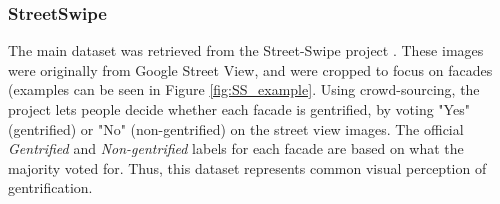 \subsubsection{StreetSwipe}
The main dataset was retrieved from the Street-Swipe project \cite{streetswipe}. These images were originally from Google Street View, and were cropped to focus on facades (examples can be seen in Figure \ref{fig:SS_example}. Using crowd-sourcing, the project lets people decide whether each facade is gentrified, by voting "Yes" (gentrified) or "No" (non-gentrified) on the street view images. The official \textit{Gentrified} and \textit{Non-gentrified} labels for each facade are based on what the majority voted for. Thus, this dataset represents common visual perception of gentrification. 


